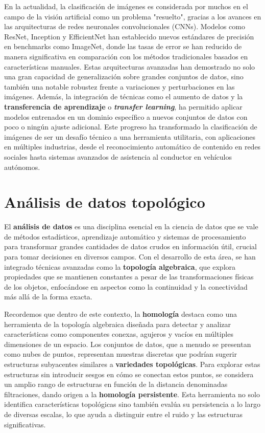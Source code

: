 En la actualidad, la clasificación de imágenes es considerada por muchos en el campo de la visión artificial como un problema "resuelto", gracias a los avances en las arquitecturas de redes neuronales convolucionales (CNNs). Modelos como ResNet, Inception y EfficientNet han establecido nuevos estándares de precisión en benchmarks como ImageNet, donde las tasas de error se han reducido de manera significativa en comparación con los métodos tradicionales basados en características manuales. Estas arquitecturas avanzadas han demostrado no solo una gran capacidad de generalización sobre grandes conjuntos de datos, sino también una notable robustez frente a variaciones y perturbaciones en las imágenes. Además, la integración de técnicas como el aumento de datos y la \textbf{transferencia de aprendizaje} o \textbf{\textit{transfer learning}}, ha permitido aplicar modelos entrenados en un dominio específico a nuevos conjuntos de datos con poco o ningún ajuste adicional. Este progreso ha transformado la clasificación de imágenes de ser un desafío técnico a una herramienta utilitaria, con aplicaciones en múltiples industrias, desde el reconocimiento automático de contenido en redes sociales hasta sistemas avanzados de asistencia al conductor en vehículos autónomos.

\section{Análisis de datos topológico}

El \textbf{análisis de datos} es una disciplina esencial en la ciencia de datos que se vale de métodos estadísticos, aprendizaje automático y sistemas de procesamiento para transformar grandes cantidades de datos crudos en información útil, crucial para tomar decisiones en diversos campos. Con el desarrollo de esta área, se han integrado técnicas avanzadas como la \textbf{topología algebraica}, que explora propiedades que se mantienen constantes a pesar de las transformaciones físicas de los objetos, enfocándose en aspectos como la continuidad y la conectividad más allá de la forma exacta.

Recordemos que dentro de este contexto, la \textbf{homología} destaca como una herramienta de la topología algebraica diseñada para detectar y analizar características como componentes conexas, agujeros y vacíos en múltiples dimensiones de un espacio. Los conjuntos de datos, que a menudo se presentan como nubes de puntos, representan muestras discretas que podrían sugerir estructuras subyacentes similares a \textbf{variedades topológicas}. Para explorar estas estructuras sin introducir sesgos en cómo se conectan estos puntos, se considera un amplio rango de estructuras en función de la distancia denominadas filtraciones, dando origen a la \textbf{homología persistente}. Esta herramienta no solo identifica características topológicas sino también evalúa su persistencia a lo largo de diversas escalas, lo que ayuda a distinguir entre el ruido y las estructuras significativas.

